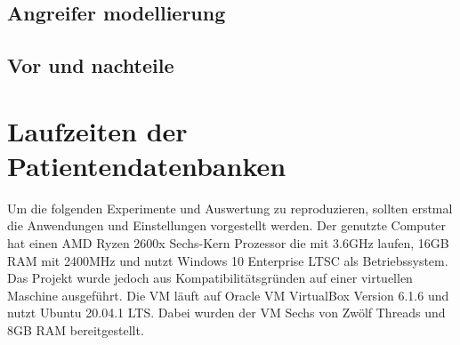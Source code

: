 \documentclass[german,version-2020-11]{uzl-thesis}
\begin{document}
\section{Angreifer modellierung}

\section{Vor und nachteile}

\chapter{Laufzeiten der Patientendatenbanken}
Um die folgenden Experimente und Auswertung zu reproduzieren, sollten erstmal die Anwendungen und Einstellungen vorgestellt werden. Der genutzte Computer hat einen AMD Ryzen 2600x Sechs-Kern Prozessor die mit 3.6GHz laufen, 16GB RAM mit 2400MHz und nutzt Windows
10 Enterprise LTSC als Betriebssystem. Das Projekt wurde jedoch aus Kompatibilitätsgründen auf einer virtuellen Maschine ausgeführt. Die VM läuft auf Oracle VM VirtualBox Version 6.1.6 und nutzt Ubuntu 20.04.1 LTS. Dabei wurden der VM Sechs von Zwölf Threads und 8GB RAM bereitgestellt. \\ \\
\end{document}
